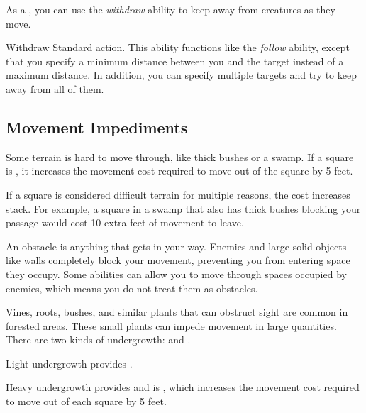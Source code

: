      As a , you can use the \textit{withdraw} ability to keep away from creatures as they move.

    \begin{activeability}{Withdraw}
      \abilityusagetime Standard action.
      \rankline
      This ability functions like the \textit{follow} ability, except that you specify a minimum distance between you and the target instead of a maximum distance.
      In addition, you can specify multiple targets and try to keep away from all of them.
    \end{activeability}

  \subsection{Movement Impediments}

    Some terrain is hard to move through, like thick bushes or a swamp.
    If a square is , it increases the movement cost required to move out of the square by 5 feet.

    If a square is considered difficult terrain for multiple reasons, the cost increases stack.
    For example, a square in a swamp that also has thick bushes blocking your passage would cost 10 extra feet of movement to leave.

    An obstacle is anything that gets in your way.
    Enemies and large solid objects like walls completely block your movement, preventing you from entering space they occupy.
    Some abilities can allow you to move through spaces occupied by enemies, which means you do not treat them as obstacles.

     Vines, roots, bushes, and similar plants that can obstruct sight are common in forested areas.
    These small plants can impede movement in large quantities.
    There are two kinds of undergrowth:  and .

    Light undergrowth provides .

    Heavy undergrowth provides  and is , which increases the movement cost required to move out of each square by 5 feet.

